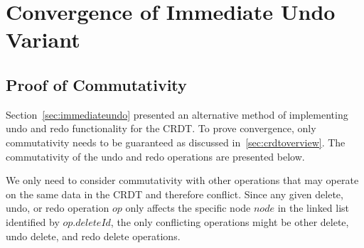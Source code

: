 \documentclass[12pt,a4paper,twoside,openright]{report}
\begin{document}
\chapter{Convergence of Immediate Undo Variant}

\section{Proof of Commutativity} \label{appendix:immundoproof}

Section~\cref{sec:immediateundo} presented an alternative method of implementing undo and redo functionality for the CRDT. To prove convergence, only commutativity needs to be guaranteed as discussed in~\cref{sec:crdtoverview}. The commutativity of the undo and redo operations are presented below.

We only need to consider commutativity with other operations that may operate on the same data in the CRDT and therefore conflict. Since any given delete, undo, or redo operation $op$ only affects the specific node $node$ in the linked list identified by $op.deleteId$, the only conflicting operations might be other delete, undo delete, and redo delete operations.
						
\end{document}
